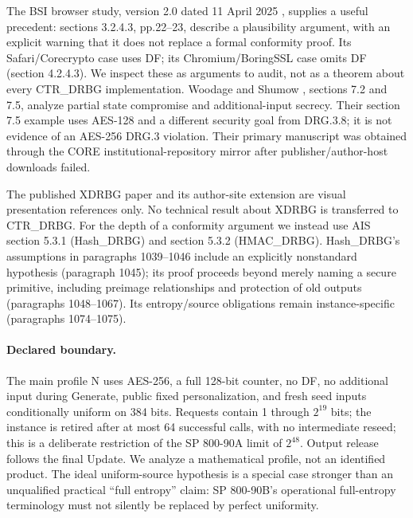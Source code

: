\documentclass[11 pt,a 4 paper]{article}
\begin{document}
The BSI browser study, version 2.0 dated 11 April 2025 \cite{browser}, supplies a useful precedent: sections 3.2.4.3, pp.22--23, describe a plausibility argument, with an explicit warning that it does not replace a formal conformity proof. Its Safari/Corecrypto case uses DF; its Chromium/BoringSSL case omits DF (section 4.2.4.3). We inspect these as arguments to audit, not as a theorem about every CTR\_DRBG implementation. Woodage and Shumow \cite{ws}, sections 7.2 and 7.5, analyze partial state compromise and additional-input secrecy. Their section 7.5 example uses AES-128 and a different security goal from DRG.3.8; it is not evidence of an AES-256 DRG.3 violation. Their primary manuscript was obtained through the CORE institutional-repository mirror after publisher/author-host downloads failed.

The published XDRBG paper and its author-site extension \cite{xdrbg,xextended} are visual presentation references only. No technical result about XDRBG is transferred to CTR\_DRBG. For the depth of a conformity argument we instead use AIS section 5.3.1 (Hash\_DRBG) and section 5.3.2 (HMAC\_DRBG). Hash\_DRBG's assumptions in paragraphs 1039--1046 include an explicitly nonstandard hypothesis (paragraph 1045); its proof proceeds beyond merely naming a secure primitive, including preimage relationships and protection of old outputs (paragraphs 1048--1067). Its entropy/source obligations remain instance-specific (paragraphs 1074--1075).

\paragraph{Declared boundary.} The main profile N uses AES-256, a full 128-bit counter, no DF, no additional input during Generate, public fixed personalization, and fresh seed inputs conditionally uniform on 384 bits. Requests contain 1 through $2^{19}$ bits; the instance is retired after at most 64 successful calls, with no intermediate reseed; this is a deliberate restriction of the SP 800-90A limit of $2^{48}$. Output release follows the final Update. We analyze a mathematical profile, not an identified product. The ideal uniform-source hypothesis is a special case stronger than an unqualified practical ``full entropy'' claim: SP 800-90B's operational full-entropy terminology must not silently be replaced by perfect uniformity.
\end{document}
